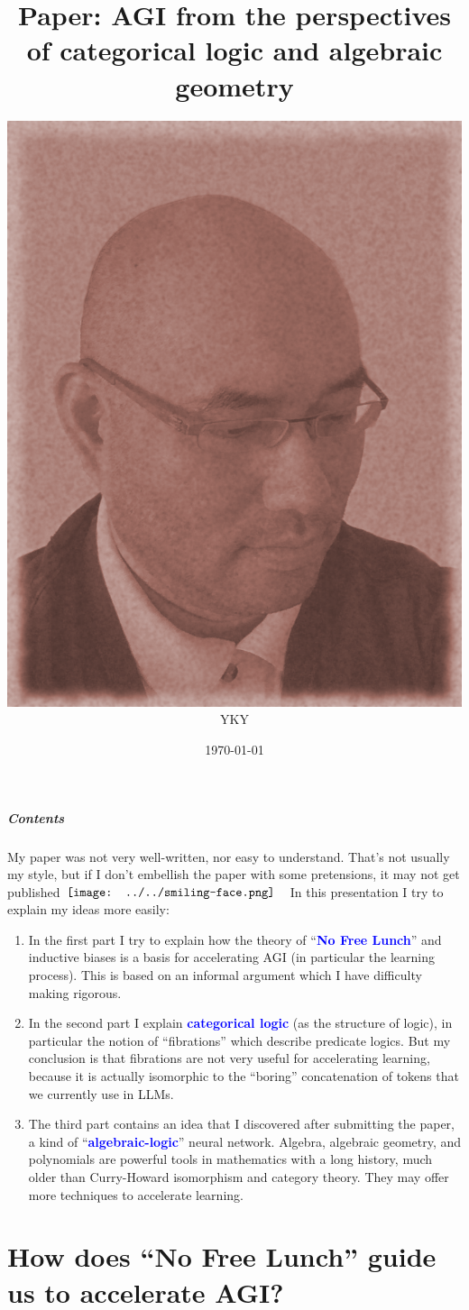 \documentclass[16pt]{beamer}
\title[AGI and categorical logic]{{Paper: AGI from the perspectives of categorical logic and algebraic geometry}}
\author{\includegraphics[scale=0.14]{John_Grothendieck.png} \\ \centering YKY}
\date{\today} %
\let\oldtextbf\textbf
\renewcommand{\textbf}[1]{\textcolor{blue}{\oldtextbf{#1}}}
\newcommand{\smiley}{$\vcenter{\hbox{\texttt{[image: ../../smiling-face.png]}}}$}
\begin{document}
\addtocounter{page}{-1}
\begin{frame}
\titlepage
\end{frame}

\addtocounter{page}{-1}
\begin{frame}[noframenumbering]
\frametitle{Contents}
\fontsize{10pt}{8}\selectfont
My paper was not very well-written, nor easy to understand.  That's not usually my style, but if I don't embellish the paper with some pretensions, it may not get published \smiley  \ \ In this presentation I try to explain my ideas more easily: \\

\begin{enumerate}[I]
	\item In the first part I try to explain how the theory of ``\textbf{No Free Lunch}'' and inductive biases is a basis for accelerating AGI (in particular the learning process).  This is based on an informal argument which I have difficulty making rigorous.
	
	\item In the second part I explain \textbf{categorical logic} (as the structure of logic), in particular the notion of ``fibrations'' which describe predicate logics.  But my conclusion is that fibrations are not very useful for accelerating learning, because it is actually isomorphic to the ``boring'' concatenation of tokens that we currently use in LLMs.
	
	\item The third part contains an idea that I discovered after submitting the paper, a kind of ``\textbf{algebraic-logic}'' neural network.  Algebra, algebraic geometry, and polynomials are powerful tools in mathematics with a long history, much older than Curry-Howard isomorphism and category theory.  They may offer more techniques to accelerate learning.
\end{enumerate}
\end{frame}


\part{How does ``No Free Lunch'' guide us to accelerate AGI?}
\frame{\partpage}
\end{document}
